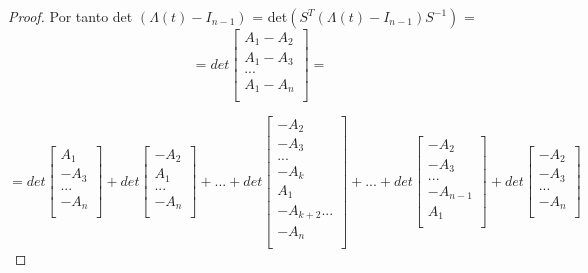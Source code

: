\documentclass[14pt]{extarticle}
\begin{document}
\begin{lem}
\begin{proof}
	           Por tanto det $(\Lambda(t) - I_{n-1})$ = det$(S^{T}(\Lambda(t) - I_{n-1})S^{-1})$ = 
	           \[=det\begin{bmatrix}
	           A_{1} - A_{2} \\
	           A_{1} - A_{3} \\
	           ... \\	
	           A_{1} - A_{n} \\
	           \end{bmatrix}=\]
	           
	           \[=det\begin{bmatrix}
	           A_{1}  \\
	           - A_{3} \\
	           ... \\	
	           - A_{n} \\
	           \end{bmatrix}+det\begin{bmatrix}
	           -A_{2}  \\
	           A_{1} \\
	           ... \\	
	           - A_{n} \\
	           \end{bmatrix}+...+det\begin{bmatrix}
	           -A_{2}  \\
	           -A_{3} \\
	           ... \\
	           -A_{k}\\
	           A_{1}\\
	           -A_{k+2}
	           ...\\	
	           - A_{n} \\
	           \end{bmatrix}+...+det\begin{bmatrix}
	           -A_{2}  \\
	           - A_{3} \\
	           ... \\	
	           - A_{n-1} \\
	           A_{1}\\
	           \end{bmatrix}+det\begin{bmatrix}
	           - A_{2}  \\
	           - A_{3} \\
	           ... \\	
	           - A_{n} \\
	           \end{bmatrix}\]
	           

\end{proof}
\end{lem}
\end{document}
